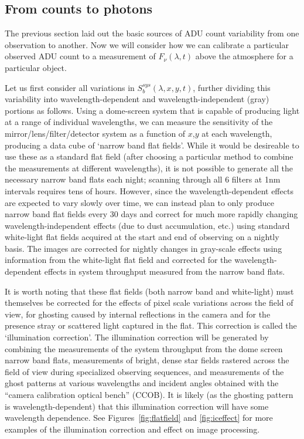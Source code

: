 \documentclass[12pt,preprint]{aastex}
\begin{document}
\subsection{From counts to photons}

The previous section laid out the basic sources of ADU count
variability from one observation to another. Now we will consider how
we can calibrate a particular observed ADU count to a
measurement of $F_\nu(\lambda,t)$ above the atmosphere for a particular object.

Let us first consider all variations in $S_b^{sys}(\lambda,x,y,t)$,
further dividing this variability into wavelength-dependent and
wavelength-independent (gray) portions as follows. Using a dome-screen
system that is capable of producing light at a range of individual
wavelengths, we can measure the sensitivity of
the mirror/lens/filter/detector system as a function of $x$,$y$ at
each wavelength, producing a data cube of `narrow band flat
fields'. While it would be desireable to use these as a standard flat
field (after choosing a particular method to combine the measurements
at different wavelengths), it is not possible to generate all the
necessary narrow band flats each night; scanning through all 6 filters
at 1nm intervals requires tens of hours. However, since the
wavelength-dependent effects are expected to vary slowly over time, we
can instead plan to only produce narrow band flat fields every 30 days
and correct for much more rapidly changing wavelength-independent
effects (due to dust accumulation, etc.) using standard white-light
flat fields acquired at the start and end of observing on a nightly
basis.  The images are corrected for nightly changes in gray-scale
effects using information from the white-light flat field and
corrected for the wavelength-dependent effects in system throughput
measured from the narrow band flats.

It is worth noting that these flat fields (both narrow band and
white-light) must themselves be corrected for the effects of pixel
scale variations across the field of view, for ghosting caused by
internal reflections in the camera and for the presence stray or
scattered light captured in the flat. This correction is called the
`illumination correction'. The illumination correction will be
generated by combining the measurements of the system throughput from
the dome screen narrow band flats, measurements of bright, dense star
fields rastered across the field of view during specialized observing
sequences, and measurements of the ghost patterns at various
wavelengths and incident angles obtained with the ``camera calibration
optical bench'' (CCOB).  It is likely (as the ghosting pattern is
wavelength-dependent) that this illumination correction will have some
wavelength dependence. See Figures~\ref{fig:flatfield} and
\ref{fig:iceffect} for more examples of the illumination correction
and effect on image processing.
\end{document}
